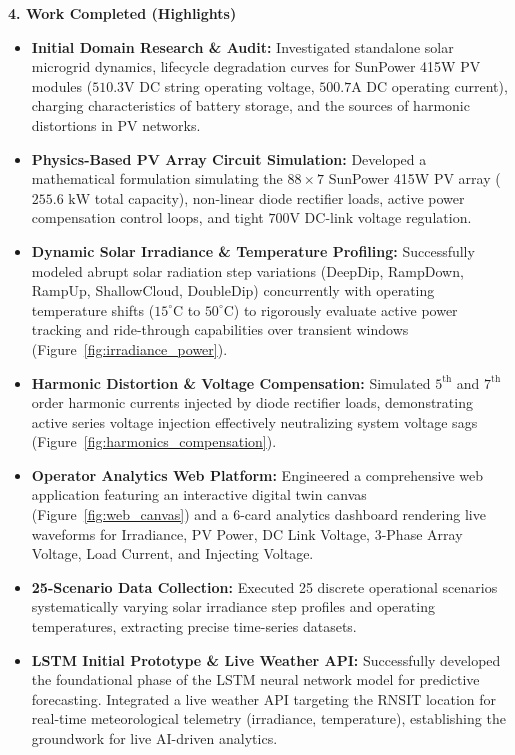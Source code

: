 \documentclass[11pt,a4paper]{article}
\newcommand{\sectionheader}[1]{\vspace{10pt}\noindent\Large\textbf{#1}\vspace{4pt}\normalsize}
\begin{document}
\sectionheader{4. Work Completed (Highlights)}
\begin{itemize}
    \item \textbf{Initial Domain Research \& Audit:} Investigated standalone solar microgrid dynamics, lifecycle degradation curves for SunPower 415W PV modules ($510.3\text{V DC}$ string operating voltage, $500.7\text{A DC}$ operating current), charging characteristics of battery storage, and the sources of harmonic distortions in PV networks.
    \item \textbf{Physics-Based PV Array Circuit Simulation:} Developed a mathematical formulation simulating the $88 \times 7$ SunPower 415W PV array ($255.6\text{ kW}$ total capacity), non-linear diode rectifier loads, active power compensation control loops, and tight $700\text{V}$ DC-link voltage regulation.
    \item \textbf{Dynamic Solar Irradiance \& Temperature Profiling:} Successfully modeled abrupt solar radiation step variations (DeepDip, RampDown, RampUp, ShallowCloud, DoubleDip) concurrently with operating temperature shifts ($15^\circ\text{C}$ to $50^\circ\text{C}$) to rigorously evaluate active power tracking and ride-through capabilities over transient windows (Figure~\ref{fig:irradiance_power}).
    \item \textbf{Harmonic Distortion \& Voltage Compensation:} Simulated $5^{\text{th}}$ and $7^{\text{th}}$ order harmonic currents injected by diode rectifier loads, demonstrating active series voltage injection effectively neutralizing system voltage sags (Figure~\ref{fig:harmonics_compensation}).
    \item \textbf{Operator Analytics Web Platform:} Engineered a comprehensive web application featuring an interactive digital twin canvas (Figure~\ref{fig:web_canvas}) and a 6-card analytics dashboard rendering live waveforms for Irradiance, PV Power, DC Link Voltage, 3-Phase Array Voltage, Load Current, and Injecting Voltage.
    \item \textbf{25-Scenario Data Collection:} Executed 25 discrete operational scenarios systematically varying solar irradiance step profiles and operating temperatures, extracting precise time-series datasets.
    \item \textbf{LSTM Initial Prototype \& Live Weather API:} Successfully developed the foundational phase of the LSTM neural network model for predictive forecasting. Integrated a live weather API targeting the RNSIT location for real-time meteorological telemetry (irradiance, temperature), establishing the groundwork for live AI-driven analytics.
\end{itemize}
\end{document}
